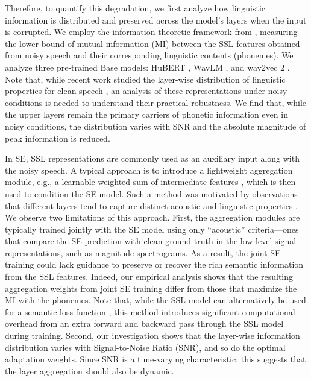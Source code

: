 \documentclass{article}
\begin{document}
Therefore, to quantify this degradation, we first analyze how linguistic information is distributed and preserved across the model's layers when the input is corrupted.
We employ the information-theoretic framework from \cite{mutual}, measuring the lower bound of mutual information (MI) between the SSL features obtained from noisy speech and their corresponding linguistic contents (phonemes). 
We analyze three pre-trained Base models: HuBERT \cite{hubert}, WavLM \cite{wavlm}, and wav2vec 2 \cite{wav2vec2}.
Note that, while recent work studied the layer-wise distribution of linguistic properties for clean speech \cite{layerwise_w2v, layerwise_all}, an analysis of these representations under noisy conditions is needed to understand their practical robustness.
We find that, while the upper layers remain the primary carriers of phonetic information even in noisy conditions, the distribution varies with SNR and the absolute magnitude of peak information is reduced.

In SE, SSL representations are commonly used as an auxiliary input along with the noisy speech. A typical approach is to introduce a lightweight aggregation module, e.g., a learnable weighted sum of intermediate features \cite{wsum_eval, wsum_acoustic_se, genhancer, ditse}, which is then used to condition the SE model. Such a method was motivated by observations that different layers tend to capture distinct acoustic and linguistic properties \cite{layerwise_w2v, layerwise_all}. 
We observe two limitations of this approach.
First, the aggregation modules are typically trained jointly with the SE model using only ``acoustic'' criteria---ones that compare the SE prediction with clean ground truth in the low-level signal representations, such as magnitude spectrograms. As a result, the joint SE training could lack guidance to preserve or recover the rich semantic information from the SSL features. 
Indeed, our empirical analysis shows that the resulting aggregation weights from joint SE training differ from those that maximize the MI with the phonemes.
Note that, while the SSL model can alternatively be used for a semantic loss function \cite{ssl_loss, ssl_for_se, ssl_loss_for_ssl}, this method introduces significant computational overhead from an extra forward and backward pass through the SSL model during training.
Second, our investigation shows that the layer-wise information distribution varies with Signal-to-Noise Ratio (SNR), and so do the optimal adaptation weights. Since SNR is a time-varying characteristic, this suggests that the layer aggregation should also be dynamic. 
\end{document}

